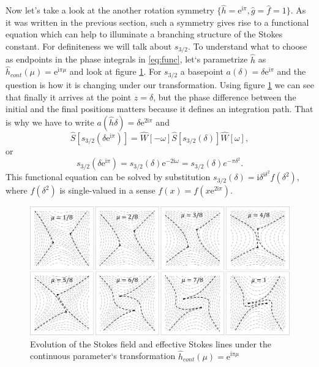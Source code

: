 \documentclass[atmp]{ipart_v1}
\def\rme{\mathrm{e}}
\def\rmi{\mathrm{i}}
\def\f{\hat{f}}
\def\g{\hat{g}}
\def\h{\hat{h}}
\def\S{\widehat{S}}
\def\W{\widehat{W}}
\def\unity{1}
\def\w{\omega}
\newcommand\eref[1]{\eqref{#1}}
\newcommand\fref[1]{figure \ref{#1}}
\begin{document}
Now let's take a look at the another rotation symmetry $\{\h=\rme^{\rmi\pi},\g=\f=\unity\}$. 
As it was written in the previous section, such a symmetry gives rise to a functional 
equation which can help to illuminate a branching structure of the Stokes constant. 
For definiteness we will talk about $s_{3/2}$. To understand what to choose as endpoints 
in the phase integrals in \eref{eq:func}, let`s parametrize $\h$ as $\h_{cont}(\mu)=\rme^{\rmi\pi\mu}$ 
and look at \fref{fig:webrs}. For $s_{3/2}$ a basepoint $a(\delta)=\delta \rme^{\rmi\pi}$ 
and the question is how it is changing under our transformation. Using \fref{fig:webrs} 
we can see that finally it arrives at the point $z=\delta$, but the phase difference between the
initial and the final positions matters because it defines an integration path.
That is why we have to write $a(\h\delta)=\delta \rme^{2\rmi\pi}$ and
\begin{equation}
\S \left[ s_{3/2}(\delta \rme^{\rmi\pi}) \right] = 
\W \left[- \w \right]
\S \left[ s_{3/2} (\delta) \right]
\W \left[  \w \right],
\end{equation}
or
\begin{equation}
s_{3/2}(\delta \rme^{\rmi\pi})=s_{3/2}(\delta)\rme^{-2\rmi \w}=s_{3/2}(\delta)e^{-\pi\delta^2}.
\label{eq:websym_2}
\end{equation}
This functional equation can be solved by substitution 
$s_{3/2}(\delta)=\rmi\delta^{\rmi\delta^2}f(\delta^2)$, where $f(\delta^2)$
is single-valued in a sense $f(x)=f(x \rme^{2\rmi\pi})$.

\begin{figure}
\centering
\noindent
\includegraphics[width=\textwidth]{wrs.png}
\caption{Evolution of the Stokes field and effective Stokes lines 
under the continuous parameter`s transformation $\h_{cont}(\mu)=\rme^{\rmi\pi\mu}$}
\label{fig:webrs}
\end{figure} 
\end{document}
